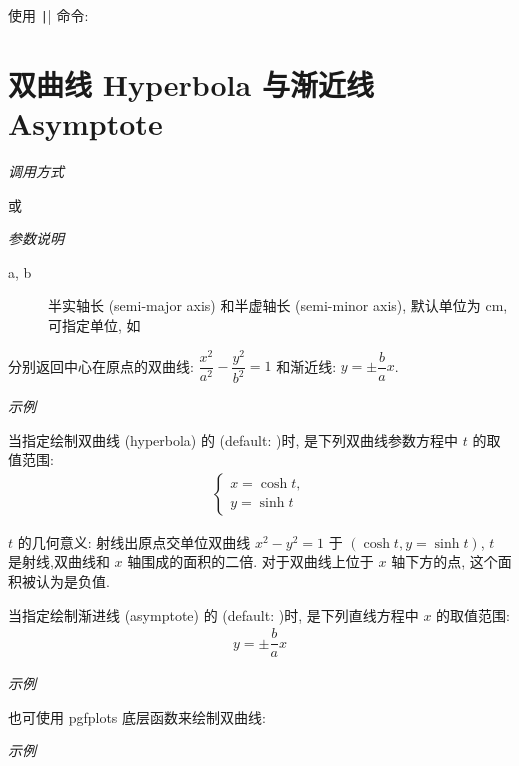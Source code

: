 
使用 \texttt|\parabola| 命令:


\section{双曲线 Hyperbola 与渐近线 Asymptote}

\emph{调用方式}

\begin{tcolorbox}{}
\end{tcolorbox}

或

\begin{tcolorbox}{}
\end{tcolorbox}

\emph{参数说明}

\begin{description}
  \item[a, b] 半实轴长 (semi-major axis) 和半虚轴长 (semi-minor axis), 默认单位为 cm, 可指定单位, 如 \verbum{(4cm, 3cm)}
\end{description}

分别返回中心在原点的双曲线: $\dfrac{x^2}{a^2}-\dfrac{y^2}{b^2}=1$ 和渐近线: $y = \pm \dfrac{b}{a}x$.

\emph{示例}


\begin{remark*}
当指定绘制双曲线 (hyperbola) 的  (default: )时,  是下列双曲线参数方程中 $t$ 的取值范围:
\begin{align*}
  \begin{cases}
  x = \cosh t,\\y = \sinh t
  \end{cases}
\end{align*}

$t$ 的几何意义: 射线出原点交单位双曲线 $x^2-y^2=1$ 于 $(\cosh t, y = \sinh t)$,
$t$ 是射线,双曲线和 $x$ 轴围成的面积的二倍. 对于双曲线上位于 $x$ 轴下方的点, 这个面积被认为是负值.

当指定绘制渐进线 (asymptote) 的  (default: )时,  是下列直线方程中 $x$ 的取值范围:
\begin{align*}
  y = \pm \dfrac{b}{a} x
\end{align*}
\end{remark*}

\emph{示例}


也可使用 pgfplots 底层函数来绘制双曲线:

\emph{示例}

